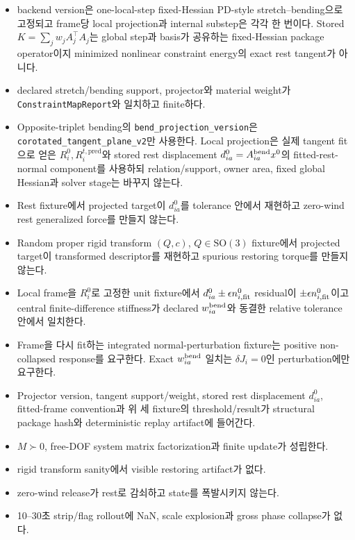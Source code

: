 \documentclass[10pt]{article}
\newcommand{\code}[1]{{\small\nolinkurl{#1}}}
\begin{document}
\begin{itemize}
  \item [\(\square\)] backend version은 one-local-step fixed-Hessian PD-style stretch--bending으로
  고정되고 frame당 local projection과 internal substep은 각각 한 번이다.
  Stored \(K=\sum_jw_jA_j^\top A_j\)는 global step과 basis가 공유하는
  fixed-Hessian package operator이지 minimized nonlinear constraint energy의 exact rest tangent가 아니다.
  \item [\(\square\)] declared stretch/bending support, projector와 material weight가
  \code{ConstraintMapReport}와 일치하고 finite하다.
  \item [\(\square\)] Opposite-triplet bending의 \code{bend\_projection\_version}은
  \code{corotated\_tangent\_plane\_v2}만 사용한다.
  Local projection은 실제 tangent fit으로 얻은 \(R_i^0,R_i^{t,\mathrm{pred}}\)와
  stored rest displacement \(d_{ia}^0=A_{ia}^{\rm bend}x^0\)의 fitted-rest-normal component를 사용하되
  relation/support, owner area, fixed global Hessian과 solver stage는 바꾸지 않는다.
  \item [\(\square\)] Rest fixture에서 projected target이 \(d_{ia}^0\)를 tolerance 안에서
  재현하고 zero-wind rest generalized force를 만들지 않는다.
  \item [\(\square\)] Random proper rigid transform \((Q,c)\), \(Q\in\mathrm{SO}(3)\) fixture에서
  projected target이 transformed descriptor를 재현하고 spurious restoring torque를 만들지 않는다.
  \item [\(\square\)] Local frame을 \(R_i^0\)로 고정한 unit fixture에서
  \(d_{ia}^0\pm\epsilon n_{i,\rm fit}^0\) residual이
  \(\pm\epsilon n_{i,\rm fit}^0\)이고 central finite-difference stiffness가
  declared \(w_{ia}^{\rm bend}\)와 동결한 relative tolerance 안에서 일치한다.
  \item [\(\square\)] Frame을 다시 fit하는 integrated normal-perturbation fixture는 positive
  non-collapsed response를 요구한다. Exact \(w_{ia}^{\rm bend}\) 일치는
  \(\delta J_i=0\)인 perturbation에만 요구한다.
  \item [\(\square\)] Projector version, tangent support/weight, stored rest displacement \(d_{ia}^0\),
  fitted-frame convention과 위 세 fixture의
  threshold/result가 structural package hash와 deterministic replay artifact에 들어간다.
  \item [\(\square\)] \(M\succ0\), free-DOF system matrix factorization과 finite update가 성립한다.
  \item [\(\square\)] rigid transform sanity에서 visible restoring artifact가 없다.
  \item [\(\square\)] zero-wind release가 rest로 감쇠하고 state를 폭발시키지 않는다.
  \item [\(\square\)] 10--30초 strip/flag rollout에 NaN, scale explosion과 gross phase collapse가 없다.
\end{itemize}
\end{document}
